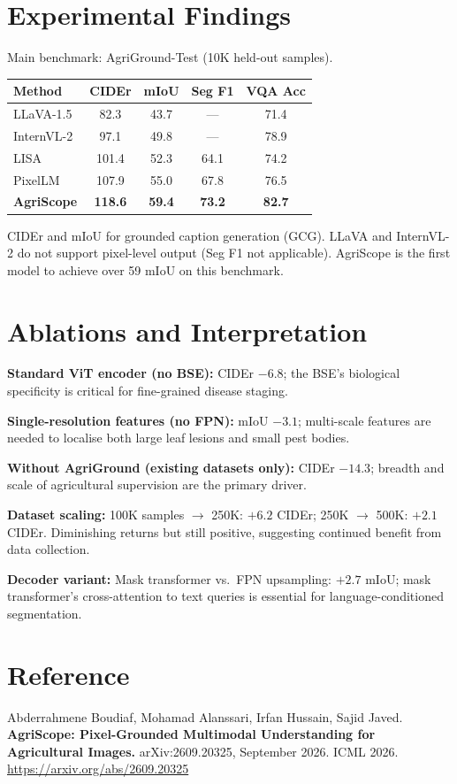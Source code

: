 \documentclass[10pt,twocolumn]{article}
\begin{document}
\section{Experimental Findings}

Main benchmark: AgriGround-Test (10K held-out samples).

\begin{center}
\small
\begin{tabular}{lcccc}
\toprule
Method & CIDEr & mIoU & Seg F1 & VQA Acc \\
\midrule
LLaVA-1.5 & 82.3 & 43.7 & --- & 71.4 \\
InternVL-2 & 97.1 & 49.8 & --- & 78.9 \\
LISA & 101.4 & 52.3 & 64.1 & 74.2 \\
PixelLM & 107.9 & 55.0 & 67.8 & 76.5 \\
\textbf{AgriScope} & \textbf{118.6} & \textbf{59.4} & \textbf{73.2} & \textbf{82.7} \\
\bottomrule
\end{tabular}
\end{center}

CIDEr and mIoU for grounded caption generation (GCG). LLaVA and
InternVL-2 do not support pixel-level output (Seg F1 not applicable).
AgriScope is the first model to achieve over 59 mIoU on this benchmark.

\section{Ablations and Interpretation}

\textbf{Standard ViT encoder (no BSE):} CIDEr $-6.8$; the BSE's
biological specificity is critical for fine-grained disease staging.

\textbf{Single-resolution features (no FPN):} mIoU $-3.1$; multi-scale
features are needed to localise both large leaf lesions and small pest bodies.

\textbf{Without AgriGround (existing datasets only):} CIDEr $-14.3$;
breadth and scale of agricultural supervision are the primary driver.

\textbf{Dataset scaling:} 100K samples $\to$ 250K: $+6.2$ CIDEr;
250K $\to$ 500K: $+2.1$ CIDEr. Diminishing returns but still positive,
suggesting continued benefit from data collection.

\textbf{Decoder variant:} Mask transformer vs.\ FPN upsampling:
$+2.7$ mIoU; mask transformer's cross-attention to text queries is
essential for language-conditioned segmentation.

\section*{Reference}

Abderrahmene Boudiaf, Mohamad Alanssari, Irfan Hussain, Sajid Javed.
\textbf{AgriScope: Pixel-Grounded Multimodal Understanding for Agricultural
Images.}
arXiv:2609.20325, September 2026. ICML 2026.
\url{https://arxiv.org/abs/2609.20325}
\end{document}
